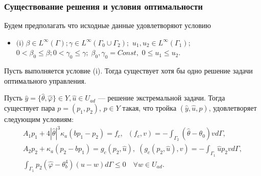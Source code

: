 \begin{frame}
    \frametitle{Существование решения и условия оптимальности}
    Будем предполагать что исходные данные удовлетворяют условию
    \begin{itemize}
        \item $\text{(i)}\;\beta\in L^\infty(\Gamma); \gamma \in L^\infty(\Gamma_0\cup\Gamma_2);$
        $u_1, u_2 \in L^\infty(\Gamma_1);$
        $0 < \beta_0 \le \beta; 0 < \gamma_0 \le \gamma;\; \beta_0,\gamma_0=Const,$
        $0 \le u_1 \le u_2$.
    \end{itemize}
    \begin{theorem}
        Пусть выполняется условие (i).
        Тогда существует хотя бы одно решение задачи оптимального управления.
    \end{theorem}

    \begin{theorem}
        \label{th:2_1:2}
        Пусть $\hat{y}=\{\hat{\theta},\hat{\varphi} \} \in Y, \hat{u} \in U_{ad}$
        --- решение экстремальной задачи.
        Тогда существует пара $p = (p_1, p_2)$, $p \in Y$
        такая, что тройка $(\hat{y}, \hat{u}, p)$, удовлетворяет следующим условиям:
        \begin{gather*}
            A_1 p_1 + 4 |\hat{\theta}|^3 \kappa_a(b p_1 - p_2) = f_c,
            \;\; (f_c,v) = - \int_{\Gamma_2} (\hat{\theta} - \theta_0) v d\Gamma, \\
            A_2 p_2 + \kappa_a (p_2-b p_1) = g_c(p_2, \hat{u}),
            \;(g_c(p_2, \hat{u}), v) = -\int_{\Gamma_1} \hat{u} p_2 v d\Gamma, \\
            \int_{\Gamma_1} p_2 (\hat{\varphi} - \theta_b^4)(u-w) d\Gamma
            \leq 0 \quad \forall w \in U_{ad}.
        \end{gather*}
    \end{theorem}
\end{frame}

